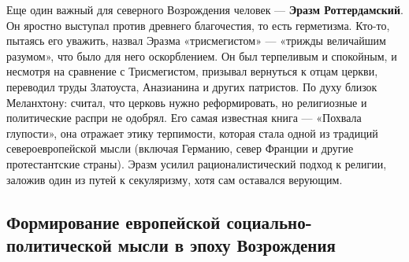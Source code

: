
Еще один важный для северного Возрождения человек --- \textbf{Эразм Роттердамский}. Он яростно выступал против древнего благочестия, то есть герметизма. Кто-то, пытаясь его уважить, назвал Эразма «трисмегистом» --- «трижды величайшим разумом», что было для него оскорблением. Он был терпеливым и спокойным, и несмотря на сравнение с Трисмегистом, призывал вернуться к отцам церкви, переводил труды Златоуста, Аназианина и других патристов. По духу близок Меланхтону: считал, что церковь нужно реформировать, но религиозные и политические распри не одобрял.
Его самая известная книга --- «Похвала глупости», она отражает этику терпимости, которая стала одной из традиций североевропейской мысли (включая Германию, север Франции и другие протестантские страны). Эразм усилил рационалистический подход к религии, заложив один из путей к секуляризму, хотя сам оставался верующим.

\subsection{Формирование европейской социально-политической мысли в эпоху Возрождения}


